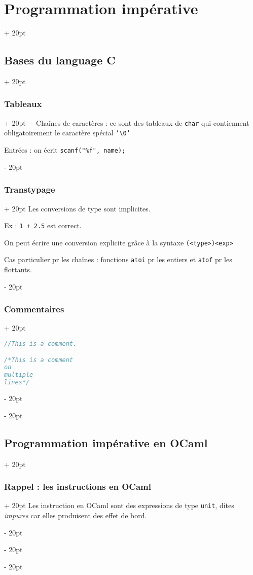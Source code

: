 \documentclass[a4paper, 12pt, twoside]{article}
\newcommand{\ind}[1][20pt]{\advance\leftskip + #1}
\newcommand{\deind}[1][20pt]{\advance\leftskip - #1}
\newenvironment{indentedenv}[1][20pt]{\par \ind[#1]}{\par \deind}
\newenvironment{indt}[2][20pt]{#2 \begin{indentedenv}[#1]}{\end{indentedenv}} %
\begin{document}
\begin{indt}{\section{Programmation impérative}}
\begin{indt}{\subsection{Bases du language C}}
\begin{indt}{\subsubsection{Tableaux}}
                $-$ Chaînes de caractères : ce sont des tableaux de \texttt{char} qui contiennent obligatoirement le caractère spécial \texttt{'\textbackslash 0'}
                
                Entrées : on écrit \texttt{scanf("\%f", name);}
            \end{indt}
            
            \vspace{12pt}
            
            \begin{indt}{\subsubsection{Transtypage}}
                Les conversions de type sont implicites.
                
                Ex : \texttt{1 + 2.5} est correct.
                
                On peut écrire une conversion explicite grâce à la syntaxe \texttt{(<type>)<exp>}
                
                Cas particulier pr les chaînes : fonctions \texttt{atoi} pr les entiers et \texttt{atof} pr les flottants.
            \end{indt}
            
            \vspace{12pt}
            
            \begin{indt}{\subsubsection{Commentaires}}
                \begin{lstlisting}[language=C, xleftmargin=80pt]
//This is a comment.

/*This is a comment
on 
multiple
lines*/
                \end{lstlisting}
            \end{indt}
            
        \end{indt}
        
        \begin{indt}{\subsection{Programmation impérative en OCaml}}
            
            \begin{indt}{\subsubsection{Rappel : les instructions en OCaml}}
                Les instruction en OCaml sont des expressions de type \texttt{unit}, dites \textit{impures} car elles produisent des effet de bord.
                

\end{indt}
\end{indt}
\end{indt}
\end{document}

